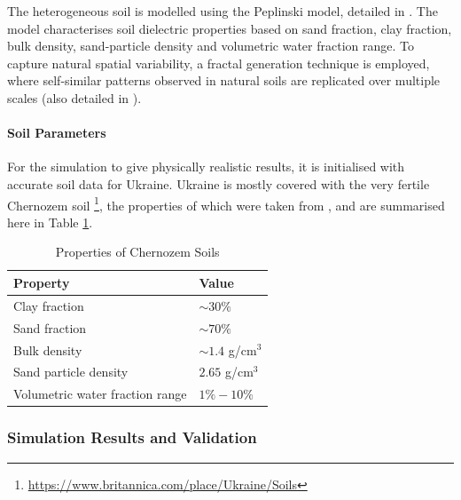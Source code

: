         \noindent The heterogeneous soil is modelled using the Peplinski model, detailed in \cite{warren2016gprmax}. The model characterises soil dielectric properties based on sand fraction, clay fraction, bulk density, sand-particle density and volumetric water fraction range. To capture natural spatial variability, a fractal generation technique is employed, where self-similar patterns observed in natural soils are replicated over multiple scales (also detailed in \cite{warren2016gprmax}).

        \paragraph{Soil Parameters}

            For the simulation to give physically realistic results, it is initialised with accurate soil data for Ukraine. Ukraine is mostly covered with the very fertile Chernozem soil \footnote{\url{https://www.britannica.com/place/Ukraine/Soils}}, the properties of which were taken from \cite{suleymanov2021chernozem}, and are summarised here in Table \ref{tab:chernozem}.

            \begin{table}[htbp]
              \centering

              \begin{tabular}{@{} l l @{}} 
                \toprule
                \textbf{Property} & \textbf{Value} \\
                \midrule
                Clay fraction & $\sim 30\%$ \\
                Sand fraction & $\sim 70\%$ \\
                Bulk density & $\sim 1.4$ g/cm$^3$ \\
                Sand particle density & $2.65$ g/cm$^3$ \\
                Volumetric water fraction range & $1\% - 10\%$ \\
                \bottomrule
              \end{tabular}
              \caption{Properties of Chernozem Soils}
              \label{tab:chernozem}
            \end{table}
    

    
    \subsubsection{Simulation Results and Validation}

